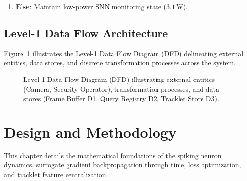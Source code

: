 \documentclass[12pt,a4paper]{report}
\begin{document}
\begin{tcolorbox}[colback=white,colframe=lavenderDark,title={\textbf{Algorithm 1: Event-Driven Surveillance Pipeline}},fonttitle=\bfseries]
\begin{small}
\begin{enumerate}
\begin{enumerate}
\begin{enumerate}
\begin{enumerate}
            \end{enumerate}
            \item Compute centralized gallery vectors $\mathbf{c}_g$ after Mahalanobis outlier filtering.
            \item Compute query vector $\mathbf{c}_q$ from flagged crops.
            \item Compute cosine similarity $\text{sim}(\mathbf{c}_q, \mathbf{c}_g) = \mathbf{c}_q^T \mathbf{c}_g$.
            \item \textbf{If} $\text{sim}(\mathbf{c}_q, \mathbf{c}_g) \ge \theta_s$ \textbf{then} output matched trajectory across cameras.
        \end{enumerate}
        \item \textbf{Else}: Maintain low-power SNN monitoring state ($3.1\,\text{W}$).
    \end{enumerate}
\end{enumerate}
\end{small}
\end{tcolorbox}

\section{Level-1 Data Flow Architecture}
Figure~\ref{fig:data_flow_diagram} illustrates the Level-1 Data Flow Diagram (DFD) delineating external entities, data stores, and discrete transformation processes across the system.

\begin{figure}[H]
    \centering
    \caption{Level-1 Data Flow Diagram (DFD) illustrating external entities (Camera, Security Operator), transformation processes, and data stores (Frame Buffer D1, Query Registry D2, Tracklet Store D3).}
    \label{fig:data_flow_diagram}
\end{figure}


\chapter{Design and Methodology}

This chapter details the mathematical foundations of the spiking neuron dynamics, surrogate gradient backpropagation through time, loss optimization, and tracklet feature centralization.
\end{document}
